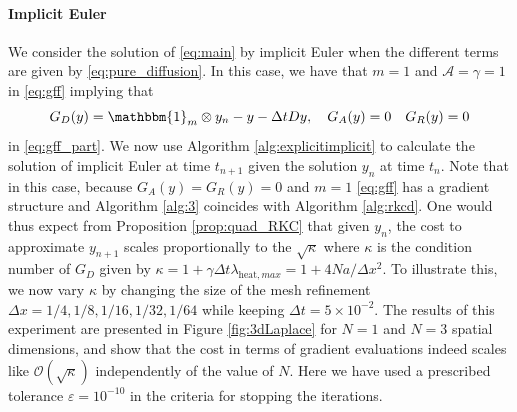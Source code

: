 \documentclass[10pt,a4paper]{article}
\begin{document}
\paragraph{Implicit Euler}
We consider the solution of \eqref{eq:main} by implicit Euler when the different terms are given by \eqref{eq:pure_diffusion}. In this case, we have that $m=1$ and $\mathcal{A}=\gamma=1$ in \eqref{eq:gff} implying that 
\begin{equation} \label{pure_diffusion1}
G_{D}(y)= \mathbbm{1}_m\otimes y_{n}-y-\Delta t D y, \quad G_{A}(y)=0 \quad G_{R}(y)=0
\end{equation}
in \eqref{eq:gff_part}.  
We now use Algorithm \ref{alg:explicitimplicit} to calculate the solution of implicit Euler at time $t_{n+1}$ given the solution $y_{n}$ at time $t_{n}$. Note that in this case, because $G_{A}(y)=G_{R}(y)=0$  and $m=1$ \eqref{eq:gff} has a gradient structure and Algorithm \ref{alg:3} coincides with Algorithm \ref{alg:rkcd}. One would thus expect from Proposition \ref{prop:quad_RKC} that given $y_{n}$, the cost to approximate $y_{n+1}$ scales proportionally to the 
$\sqrt{\kappa}$ where $\kappa$ is the condition number of $G_{D}$ given by $\kappa=1+\gamma \Delta t \lambda_{\text{heat},max}=1+4Na/\Delta x^{2}$.  To illustrate this, we now vary $\kappa$ by changing the size of the mesh refinement $\Delta x= 1/4,1/8,1/16,1/32,1/64$ while keeping $\Delta t=5 \times 10^{-2}$. The results of this experiment are presented in Figure \ref{fig:3dLaplace} for $N=1$ and $N=3$ spatial dimensions, and show that the cost in terms of gradient evaluations indeed scales like $\mathcal{O}(\sqrt{\kappa})$ independently of the value of $N$. Here we have used a prescribed tolerance $\varepsilon=10^{-10}$ in the criteria for stopping the iterations.

\end{document}

